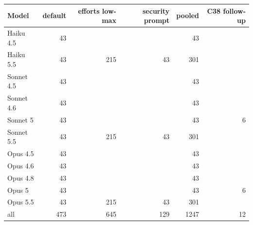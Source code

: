 \begin{tabular}{@{}lrrrrr@{}}\toprule
Model & default & efforts low-max & security prompt & pooled & C38 follow-up\\\midrule
Haiku 4.5 & 43 &  &  & 43 & \\
Haiku 5.5 & 43 & 215 & 43 & 301 & \\
Sonnet 4.5 & 43 &  &  & 43 & \\
Sonnet 4.6 & 43 &  &  & 43 & \\
Sonnet 5 & 43 &  &  & 43 & 6\\
Sonnet 5.5 & 43 & 215 & 43 & 301 & \\
Opus 4.5 & 43 &  &  & 43 & \\
Opus 4.6 & 43 &  &  & 43 & \\
Opus 4.8 & 43 &  &  & 43 & \\
Opus 5 & 43 &  &  & 43 & 6\\
Opus 5.5 & 43 & 215 & 43 & 301 & \\
\midrule all & 473 & 645 & 129 & 1247 & 12\\
\bottomrule
\end{tabular}
